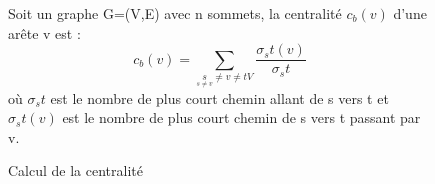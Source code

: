 \begin{figure}[H]
   \centering
   \frame
   {
      \parbox{12cm}
      {
         Soit un graphe G=(V,E) avec n sommets, la centralité $c_b(v)$ d'une arête v est :
         \begin{equation}
               c_b(v) = \sum_{\underset{s \neq v}s \neq v \neq t V} \frac{\sigma_st(v)}{\sigma_st}
         \end{equation}
	o\`u $\sigma_st$ est le nombre de plus court chemin allant de s vers t et $\sigma_st(v)$ est le nombre de plus court chemin de s vers t passant par v.
      }
   }
  \caption{\label{centralit\'e}Calcul de la centralit\'e}
\end{figure}



%
